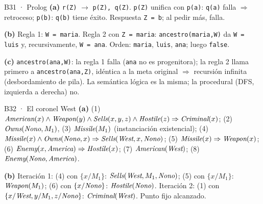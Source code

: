 \begin{solucion}{B31 · Prolog}
\textbf{(a)} \texttt{r(Z)} $\to$ \texttt{p(Z), q(Z)}. \texttt{p(Z)} unifica con \texttt{p(a)}: \texttt{q(a)} falla
$\Rightarrow$ retroceso; \texttt{p(b)}: \texttt{q(b)} tiene éxito. Respuesta \texttt{Z = b}; al pedir más, falla.

\textbf{(b)} Regla 1: \texttt{W = maria}. Regla 2 con \texttt{Z = maria}: \texttt{ancestro(maria,W)} da
\texttt{W = luis} y, recursivamente, \texttt{W = ana}. Orden: \texttt{maria}, \texttt{luis}, \texttt{ana}; luego \texttt{false}.

\textbf{(c)} \texttt{ancestro(ana,W)}: la regla 1 falla (\texttt{ana} no es progenitora); la regla 2 llama
primero a \texttt{ancestro(ana,Z)}, idéntica a la meta original $\Rightarrow$ recursión infinita
(desbordamiento de pila). La semántica lógica es la misma; la procedural (DFS, izquierda a derecha) no.
\end{solucion}

\begin{solucion}{B32 · El coronel West}
\textbf{(a)} (1) $\textit{American}(x)\wedge\textit{Weapon}(y)\wedge\textit{Sells}(x,y,z)\wedge\textit{Hostile}(z)\Rightarrow\textit{Criminal}(x)$;
(2) $\textit{Owns}(\textit{Nono},M_1)$, (3) $\textit{Missile}(M_1)$ (instanciación existencial);
(4) $\textit{Missile}(x)\wedge\textit{Owns}(\textit{Nono},x)\Rightarrow\textit{Sells}(\textit{West},x,\textit{Nono})$;
(5) $\textit{Missile}(x)\Rightarrow\textit{Weapon}(x)$; (6) $\textit{Enemy}(x,\textit{America})\Rightarrow\textit{Hostile}(x)$;
(7) $\textit{American}(\textit{West})$; (8) $\textit{Enemy}(\textit{Nono},\textit{America})$.

\textbf{(b)} Iteración 1: (4) con $\{x/M_1\}$: $\textit{Sells}(\textit{West},M_1,\textit{Nono})$; (5) con $\{x/M_1\}$: $\textit{Weapon}(M_1)$;
(6) con $\{x/\textit{Nono}\}$: $\textit{Hostile}(\textit{Nono})$. Iteración 2: (1) con
$\{x/\textit{West},y/M_1,z/\textit{Nono}\}$: $\textit{Criminal}(\textit{West})$. Punto fijo alcanzado.
\end{solucion}




